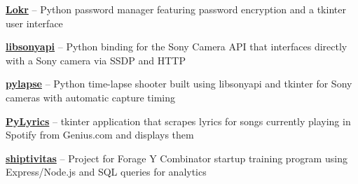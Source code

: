 \smdivider

\textbf{\href{https://github.com/petabite/Lokr}{Lokr}} -- Python password manager featuring password encryption and a tkinter user interface

\smdivider

\textbf{\href{https://github.com/petabite/libsonyapi}{libsonyapi}} -- Python binding for the Sony Camera API that interfaces directly with a Sony camera via SSDP and HTTP

\smdivider

\textbf{\href{https://github.com/petabite/pylapse}{pylapse}} -- Python time-lapse shooter built using libsonyapi and tkinter for Sony cameras with automatic capture timing

\smdivider

\textbf{\href{https://github.com/petabite/PyLyrics}{PyLyrics}} -- tkinter application that scrapes lyrics for songs currently playing in Spotify from Genius.com and displays them

\smdivider

\textbf{\href{https://github.com/petabite/shiptivitas-1}{shiptivitas}} -- Project for Forage Y Combinator startup training program using Express/Node.js and SQL queries for analytics















